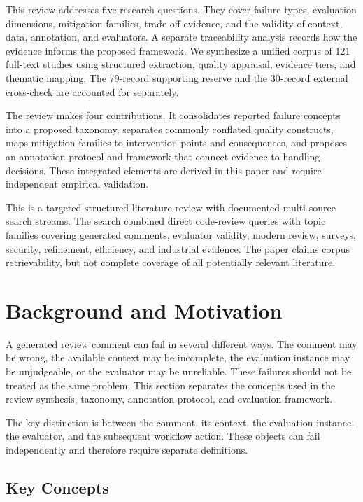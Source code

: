 \documentclass[10pt]{article}
\begin{document}
This review addresses five research questions. They cover failure types, evaluation dimensions, mitigation families, trade-off evidence, and the validity of context, data, annotation, and evaluators. A separate traceability analysis records how the evidence informs the proposed framework. We synthesize a unified corpus of 121 full-text studies using structured extraction, quality appraisal, evidence tiers, and thematic mapping. The 79-record supporting reserve and the 30-record external cross-check are accounted for separately.

The review makes four contributions. It consolidates reported failure concepts into a proposed taxonomy, separates commonly conflated quality constructs, maps mitigation families to intervention points and consequences, and proposes an annotation protocol and framework that connect evidence to handling decisions. These integrated elements are derived in this paper and require independent empirical validation.

This is a targeted structured literature review with documented multi-source search streams. The search combined direct code-review queries with topic families covering generated comments, evaluator validity, modern review, surveys, security, refinement, efficiency, and industrial evidence. The paper claims corpus retrievability, but not complete coverage of all potentially relevant literature.




\section{Background and Motivation}

A generated review comment can fail in several different ways. The comment may be wrong, the available context may be incomplete, the evaluation instance may be unjudgeable, or the evaluator may be unreliable. These failures should not be treated as the same problem. This section separates the concepts used in the review synthesis, taxonomy, annotation protocol, and evaluation framework.

The key distinction is between the comment, its context, the evaluation instance, the evaluator, and the subsequent workflow action. These objects can fail independently and therefore require separate definitions.

\subsection{Key Concepts}
\end{document}
